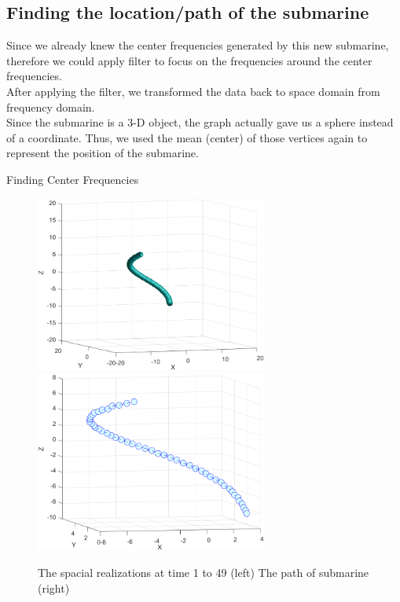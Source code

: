 \documentclass{article}
\begin{document}
\newpage
\subsection{Finding the location/path of the submarine}
Since we already knew the center frequencies generated by this new submarine, therefore we could apply filter to focus on the frequencies around the center frequencies. \\
After applying the filter, we transformed the data back to space domain from frequency domain. \\
Since the submarine is a 3-D object, the graph actually gave us a sphere instead of a coordinate. Thus, we used the mean (center) of those vertices again to represent the position of the submarine.

\begin{algorithm}
\begin{algorithmic}
    \ENDFOR
\end{algorithmic}
\caption{Finding Center Frequencies}
\end{algorithm}
\begin{figure}[h]
    \centerline{\includegraphics[width=3in]{path1.png}\includegraphics[width=3in]{path2.png}}
    \caption{The spacial realizations at time 1 to 49 (left) \quad The path of submarine (right)}
\end{figure}
\end{document}

